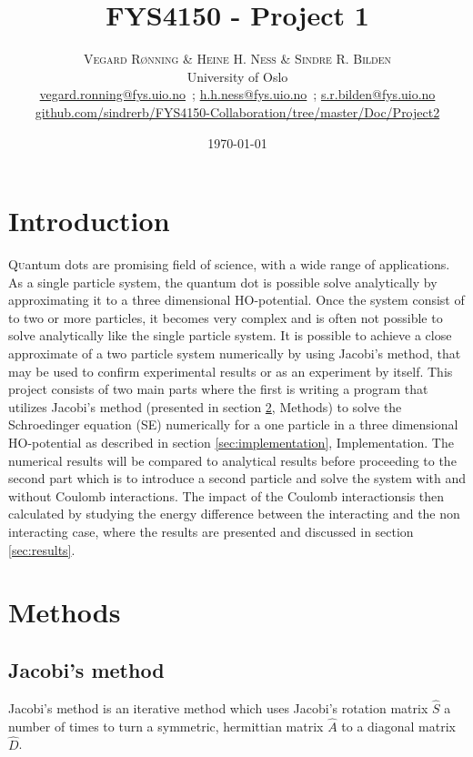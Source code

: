 \documentclass[twoside,twocolumn]{article}
\title{FYS4150 - Project 1} %
\author{%
	\textsc{Vegard R\o{}nning \& Heine H. Ness \& Sindre R. Bilden} \\[1ex] %
	\normalsize University of Oslo \\ %
	\normalsize \href{mailto:vegard.ronning@fys.uio.no}{vegard.ronning@fys.uio.no}\ ; \href{mailto:h.h.ness@fys.uio.no}{h.h.ness@fys.uio.no}\ ; \href{mailto:s.r.bilden@fys.uio.no}{s.r.bilden@fys.uio.no}\\%
	\footnotesize \href{https://github.com/sindrerb/FYS4150-Collaboration/tree/master/Doc/Project2}{github.com/sindrerb/FYS4150-Collaboration/tree/master/Doc/Project2}
}
\date{\today} %
\newcommand{\SE}{Schroedinger equation }
\newcommand{\CI}{Coulomb interactions}
\begin{document}
	
	\maketitle
	
\vspace{-2cm}
	\section{Introduction}\vspace{-0.4cm}
	\lettrine[nindent=0em,lines=2]{Q}uantum dots are promising field of science, with a wide range of applications. As a single particle system, the quantum dot is possible solve analytically by approximating it to a three dimensional HO-potential. Once the system consist of to two or more particles, it becomes very complex and is often not possible to solve analytically like the single particle system. It is possible to achieve a close approximate of a two particle system numerically by using Jacobi's method, that may be used to confirm experimental results or as an experiment by itself. This project consists of two main parts where the first is writing a program that utilizes Jacobi's method (presented in section \ref{sec:methods}, Methods) to solve the \SE (SE) numerically for a one particle in a three dimensional HO-potential as described in section \ref{sec:implementation}, Implementation. The numerical results will be compared to analytical results before proceeding to the second part which is to introduce a second particle and solve the system with and without \CI. The impact of the \CI is then calculated by studying the energy difference between the interacting and the non interacting case, where the results are presented and discussed in section \ref{sec:results}.
	\section{Methods}
	\label{sec:methods}
	\subsection{Jacobi's method}
	Jacobi's method is an iterative method which uses Jacobi's rotation matrix $\hat{S}$ a number of times to turn a symmetric, hermittian matrix $\hat{A}$ to a diagonal matrix $\hat{D}$.
	
\end{document}
